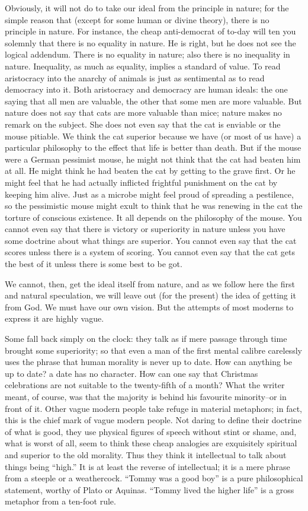 \documentclass{book}
\begin{document}
Obviously, it will not do to take our ideal from the principle in nature; for the simple reason that (except for some human or divine theory), there is no principle in nature. For instance, the cheap anti-democrat of to-day will ten you solemnly that there is no equality in nature. He is right, but he does not see the logical addendum. There is no equality in nature; also there is no inequality in nature. Inequality, as much as equality, implies a standard of value. To read aristocracy into the anarchy of animals is just as sentimental as to read democracy into it. Both aristocracy and democracy are human ideals: the one saying that all men are valuable, the other that some men are more valuable. But nature does not say that cats are more valuable than mice; nature makes no remark on the subject. She does not even say that the cat is enviable or the mouse pitiable. We think the cat superior because we have (or most of us have) a particular philosophy to the effect that life is better than death. But if the mouse were a German pessimist mouse, he might not think that the cat had beaten him at all. He might think he had beaten the cat by getting to the grave first. Or he might feel that he had actually inflicted frightful punishment on the cat by keeping him alive. Just as a microbe might feel proud of spreading a pestilence, so the pessimistic mouse might exult to think that he was renewing in the cat the torture of conscious existence. It all depends on the philosophy of the mouse. You cannot even say that there is victory or superiority in nature unless you have some doctrine about what things are superior. You cannot even say that the cat scores unless there is a system of scoring. You cannot even say that the cat gets the best of it unless there is some best to be got.

We cannot, then, get the ideal itself from nature, and as we follow here the first and natural speculation, we will leave out (for the present) the idea of getting it from God. We must have our own vision. But the attempts of most moderns to express it are highly vague.

Some fall back simply on the clock: they talk as if mere passage through time brought some superiority; so that even a man of the first mental calibre carelessly uses the phrase that human morality is never up to date. How can anything be up to date? a date has no character. How can one say that Christmas celebrations are not suitable to the twenty-fifth of a month? What the writer meant, of course, was that the majority is behind his favourite minority–or in front of it. Other vague modern people take refuge in material metaphors; in fact, this is the chief mark of vague modern people. Not daring to define their doctrine of what is good, they use physical figures of speech without stint or shame, and, what is worst of all, seem to think these cheap analogies are exquisitely spiritual and superior to the old morality. Thus they think it intellectual to talk about things being “high.” It is at least the reverse of intellectual; it is a mere phrase from a steeple or a weathercock. “Tommy was a good boy” is a pure philosophical statement, worthy of Plato or Aquinas. “Tommy lived the higher life” is a gross metaphor from a ten-foot rule.
\end{document}
